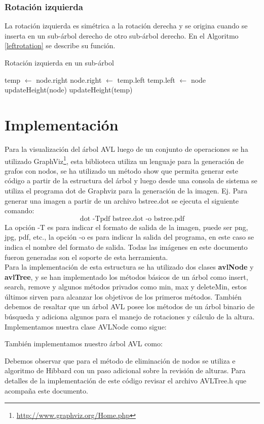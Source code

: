 \documentclass[paper=a4, fontsize=11pt]{scrartcl} %
\numberwithin{equation}{section} %
\numberwithin{figure}{section} %
\numberwithin{table}{section} %
\begin{document}
\subsubsection{Rotación izquierda}
La rotación izquierda es simétrica a la rotación derecha y se origina cuando se inserta en un sub-árbol derecho de otro sub-árbol derecho. En el Algoritmo \ref{leftrotation} se describe su función.
\begin{algorithm}
\caption{Rotación izquierda en un sub-árbol}\label{leftrotation}
\begin{algorithmic}[1]
\State temp $\gets $ node.right
\State node.right $\gets$ temp.left
\State temp.left $\gets$ node
\State updateHeight(node)
\State updateHeight(temp)
\EndProcedure
\end{algorithmic}
\end{algorithm}


\section{Implementación}
Para la visualización del árbol AVL luego de un conjunto de operaciones se ha utilizado GraphViz\footnote{\url{http://www.graphviz.org/Home.php}}, esta biblioteca utiliza un lenguaje para la generación de grafos con nodos, se ha utilizado un método show que permita generar este código a partir de la estructura del árbol y luego desde una consola de sistema se utiliza el programa dot de Graphviz para la generación de la imagen. Ej. Para generar una imagen a partir de un archivo bstree.dot se ejecuta el siguiente comando:
\[\text{dot -Tpdf bstree.dot -o bstree.pdf}\]
La opción -T es para indicar el formato de salida de la imagen, puede ser png, jpg, pdf, etc., la opción -o es para indicar la salida del programa, en este caso se indica el nombre del formato de salida. Todas las imágenes en este documento fueron generadas son el soporte de esta herramienta.\\
Para la implementación de esta estructura se ha utilizado dos clases \textbf{avlNode} y \textbf{avlTree}, y se han implementado los métodos básicos de un árbol como insert, search, remove y algunos métodos privados como min, max y deleteMin, estos últimos sirven para alcanzar los objetivos de los primeros métodos. También debemos de resaltar que un árbol AVL posee los métodos de un árbol binario de búsqueda y adiciona algunos para el manejo de rotaciones y cálculo de la altura.\\
Implementamos nuestra clase AVLNode como sigue:

También implementamos nuestro árbol AVL como:

Debemos observar que para el método de eliminación de nodos se utiliza e algoritmo de Hibbard con un paso adicional sobre la revisión de alturas. Para detalles de la implementación de este código revisar el archivo AVLTree.h que acompaña este documento.
\newpage
\end{document}
